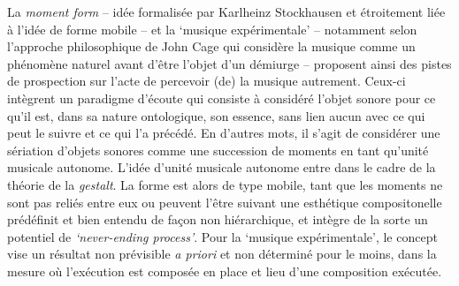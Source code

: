 \documentclass{article}
\begin{document}
%
%
%

La \textsl{moment form} -- idée formalisée par Karlheinz Stockhausen et étroitement liée à l'idée de forme mobile  -- et la `musique expérimentale' -- notamment selon l'approche philosophique de John Cage qui considère la musique comme un phénomène naturel avant d'être l'objet d'un démiurge -- proposent ainsi des pistes de prospection sur l'acte de percevoir (de) la musique autrement. Ceux-ci intègrent un paradigme d'écoute qui consiste à considéré l'objet sonore pour ce qu'il est, dans sa nature ontologique, son essence, sans lien aucun %
avec ce qui peut le suivre et ce qui l'a précédé. 
En d'autres mots, il s'agit de considérer une sériation d'objets sonores comme une succession de moments %
 en tant qu'unité musicale autonome. %
L'idée d'unité musicale autonome entre dans le cadre de la théorie de la \textit{gestalt}\label{efn:gestalt}. %
La forme est alors de type mobile, tant que les moments ne sont pas reliés entre eux ou peuvent l'être suivant une esthétique compositonelle prédéfinit et bien entendu de façon non hiérarchique, et intègre de la sorte un potentiel de \textsl{`never-ending process'}.
Pour la `musique expérimentale', le concept vise un résultat non prévisible \textit{a priori} et non déterminé pour le moins, dans la mesure où l'exécution est composée en place et lieu d'une composition exécutée. %
\end{document}
